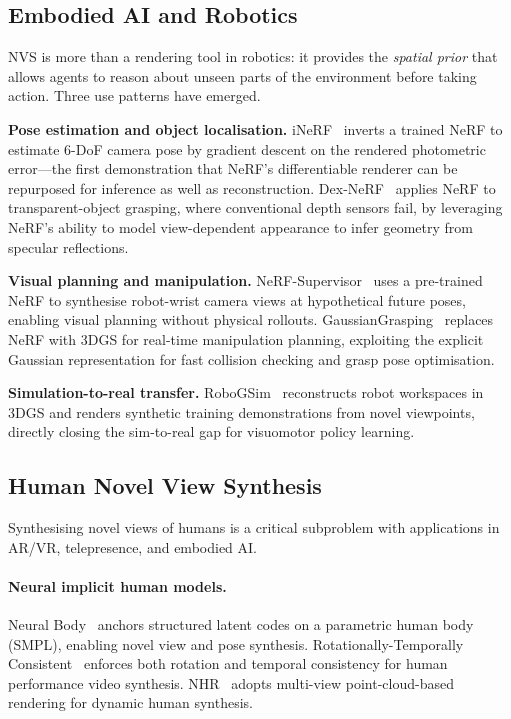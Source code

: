 \subsection{Embodied AI and Robotics}

NVS is more than a rendering tool in robotics: it provides the
\emph{spatial prior} that allows agents to reason about unseen parts of the
environment before taking action.
Three use patterns have emerged.

\textbf{Pose estimation and object localisation.}
iNeRF~\citep{yen2021inerf} inverts a trained NeRF to estimate 6-DoF camera
pose by gradient descent on the rendered photometric error---the first
demonstration that NeRF's differentiable renderer can be repurposed for
inference as well as reconstruction.
Dex-NeRF~\citep{ichnowski2021dex} applies NeRF to transparent-object grasping,
where conventional depth sensors fail, by leveraging NeRF's ability to
model view-dependent appearance to infer geometry from specular reflections.

\textbf{Visual planning and manipulation.}
NeRF-Supervisor~\citep{ze2023nerf_supervisor} uses a pre-trained NeRF to
synthesise robot-wrist camera views at hypothetical future poses, enabling
visual planning without physical rollouts.
GaussianGrasping~\citep{shorinwa2024gaussiangrasping} replaces NeRF with 3DGS
for real-time manipulation planning, exploiting the explicit Gaussian representation
for fast collision checking and grasp pose optimisation.

\textbf{Simulation-to-real transfer.}
RoboGSim~\citep{li2024robogssim} reconstructs robot workspaces in 3DGS and
renders synthetic training demonstrations from novel viewpoints, directly
closing the sim-to-real gap for visuomotor policy learning.

\subsection{Human Novel View Synthesis}

Synthesising novel views of humans is a critical subproblem with applications
in AR/VR, telepresence, and embodied AI.

\paragraph{Neural implicit human models.}
Neural Body~\citep{peng2021neuralbody} anchors structured latent codes on a
parametric human body (SMPL), enabling novel view and pose synthesis.
Rotationally-Temporally Consistent~\citep{liu2021rtcnvs} enforces both
rotation and temporal consistency for human performance video synthesis.
NHR~\citep{wu2020nhr} adopts multi-view point-cloud-based rendering for
dynamic human synthesis.

